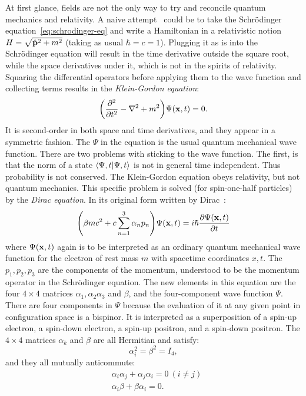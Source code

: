 At first glance, fields are not the only way to try and reconcile quantum mechanics and relativity. A naive attempt~\cite{Srednicki2007-mn} could be to take the Schrödinger equation~\ref{eq:schrodinger-eq} and write a Hamiltonian in a relativistic notion $H=\sqrt{\hat{\vb{p}}^2+m^2}$ (taking as usual $\hbar=c=1$). Plugging it as is into the Schrödinger equation will result in the time derivative outside the square root, while the space derivatives under it, which is not in the spirits of relativity. Squaring the differential operators before applying them to the wave function and collecting terms results in the \emph{Klein-Gordon equation}:
\begin{equation}
\qty(\pdv[2]{t}-\nabla^2+m^2)\Psi\qty(\vb{x},t)=0.
\label{eq:kg-wf}
\end{equation}
It is second-order in both space and time derivatives, and they appear in a symmetric fashion. The $\Psi$ in the equation is the usual quantum mechanical wave function. There are two problems with sticking to the wave function. The first, is that the norm of a state $\braket{\Psi,t}$ is not in general time independent. Thus probability is not conserved. The Klein-Gordon equation obeys relativity, but not quantum mechanics. This specific problem is solved (for spin-one-half particles) by the \emph{Dirac equation}. In its original form written by Dirac~\cite{Dirac1981-rt}:
\begin{equation}
\qty(\beta m c^2 + c\sum^3_{n=1}\alpha_n p_n)\Psi\qty(\vb{x},t)=i\hbar\pdv{\Psi\qty(\vb{x},t)}{t}
\label{eq:dirac-wf}
\end{equation}
where $\Psi\qty(\vb{x},t)$ again is to be interpreted as an ordinary quantum mechanical wave function for the electron of rest mass $m$ with spacetime coordinates $x, t$. The $p_1,p_2,p_3$ are the components of the momentum, understood to be the momentum operator in the Schrödinger equation. The new elements in this equation are the four $4\times 4$ matrices $\alpha_1,\alpha_2\alpha_3$ and $\beta$, and the four-component wave function $\Psi$. There are four components in $\Psi$ because the evaluation of it at any given point in configuration space is a bispinor. It is interpreted as a superposition of a spin-up electron, a spin-down electron, a spin-up positron, and a spin-down positron. The $4\times 4$ matrices $\alpha_k$ and $\beta$ are all Hermitian and satisfy:
\begin{equation}
\alpha_i^2=\beta^2=I_4,
\end{equation}
and they all mutually anticommute:
\begin{equation}
\begin{split}
&\alpha_i \alpha_j + \alpha_j \alpha_i = 0 \:(i\neq j) \\
&\alpha_i \beta + \beta \alpha_i = 0.
\end{split}
\end{equation}
